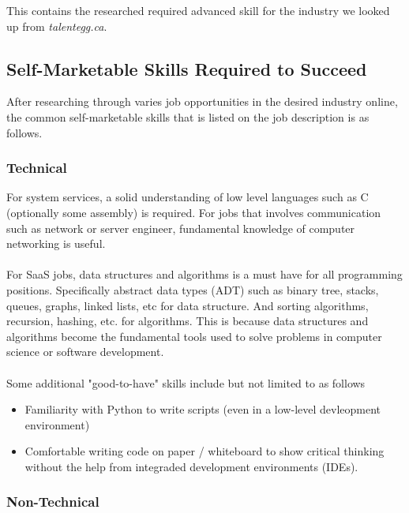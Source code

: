 \documentclass[10pt,letterpaper]{article}
\begin{document}



This contains the researched required advanced skill for the industry we looked up from \textit{talentegg.ca}\cite{talentegg}.

\subsection{Self-Marketable Skills Required to Succeed}

After researching through varies job opportunities in the desired industry online, the common self-marketable skills that is listed on the job description is as follows.

\subsubsection{Technical}

For system services, a solid understanding of low level languages such as C (optionally some assembly) is required. For jobs that involves communication such as network or server engineer, fundamental knowledge of computer networking is useful.\\
\\
For SaaS jobs, data structures and algorithms is a must have for all programming positions. Specifically abstract data types (ADT) such as binary tree, stacks, queues, graphs, linked lists, etc for data structure. And sorting algorithms, recursion, hashing, etc. for algorithms. This is because data structures and algorithms become the fundamental tools used to solve problems in computer science or software development.\\
\\
Some additional "good-to-have" skills include but not limited to as follows
\begin{itemize}
	\item Familiarity with Python to write scripts (even in a low-level devleopment environment)
	\item Comfortable writing code on paper / whiteboard to show critical thinking without the help from integraded development environments (IDEs).
\end{itemize}

\subsubsection{Non-Technical}
\end{document}
